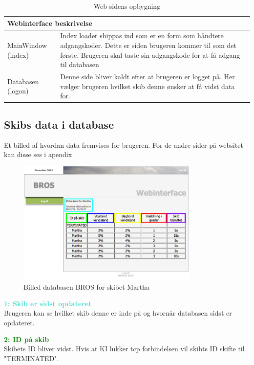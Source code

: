 \begin{table}[H]
\centering
{}
\begin{tabular}{| p{3cm}  p{12cm}|}
\multicolumn{2}{l}{{\Large Webinterface beskrivelse}} \\\hline
MainWindow \phantom{m}(index) & Index loader shippas ind som er en form som håndtere adgangskoder. Dette er siden brugeren kommer til som det første. Brugeren skal taste sin adgangskode for at få adgang til databasen\\\hline
Databasen  \phantom{m}(logon) & Denne side bliver kaldt efter at brugeren er logget på. Her vælger brugeren hvilket skib denne ønsker at få vidst data for.\\\hline
\end{tabular}
\caption{Web sidens opbygning}
\label{tabel:webside-simpel}
\end{table}

\subsection*{Skibs data i database}
Et billed af hvordan data fremvises for brugeren. For de andre sider på websitet kan disse ses i apendix
\begin{figure}[H]
	\centering
	\includegraphics[width=0.8\textwidth]{billeder/web_database_new}
	\caption{Billed databasen BROS for skibet Martha}
	\label{fig:web_database}
\end{figure}

\textcolor{Turquoise}{\textbf{1: Skib er sidst opdateret}}\\
Brugeren kan se hvilket skib denne er inde på og hvornår databasen sidst er opdateret.

\textcolor{green}{\textbf{2: ID på skib}}\\
Skibets ID bliver vidst. Hvis at KI lukker tcp forbindelsen vil skibts ID skifte til "TERMINATED".

